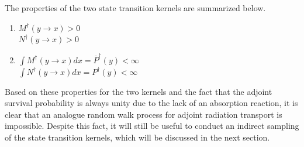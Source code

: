 The properties of the two state transition kernels are summarized below. 
\begin{enumerate}
  \item $M^{\dagger}(y \to x) > 0$ \\
    $N^{\dagger}(y \to x) > 0$
  \item $\int M^{\dagger}(y \to x)dx = \overline{P}^{\dagger}(y) < \infty$ \\
    $\int N^{\dagger}(y \to x)dx = P^{\dagger}(y) < \infty$
\end{enumerate}

Based on these properties for the two kernels and the fact that the adjoint
survival probability is always unity due to the lack of an absorption reaction,
it is clear that an analogue random walk process for adjoint radiation 
transport is impossible. Despite this fact, it will still be useful to conduct 
an indirect sampling of the state transition kernels, which will be discussed in
the next section. 


